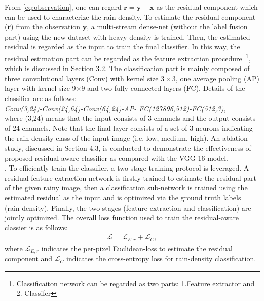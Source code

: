 \documentclass[10pt,twocolumn,letterpaper]{article}
\begin{document}
From \eqref{eq:observation}, one can regard $\mathbf{r}=\mathbf{y}-\mathbf{x}$ as the residual component which can be used to characterize the rain-density.   To estimate the residual component ($\mathbf{\hat{r}}$) from the observation $\mathbf{y}$,  a multi-stream dense-net (without the label fusion part) using the new dataset with heavy-density is trained.  Then, the estimated residual is regarded as the input to train the final classifier.  In this way, the residual estimation part can be regarded as the feature extraction procedure~\footnote{Classificaiton network can be regarded as two parts: 1.Feature extractor and 2. Classifer}, which is discussed in Section 3.2.  The classification part is mainly composed of three convolutional layers (Conv) with kernel size $3\times3$, one average pooling (AP) layer with kernel size 9$\times$9 and  two fully-connected layers (FC).  Details of the classifier are as follows:\\
\emph{Conv(3,24)-Conv(24,64)-Conv(64,24)-AP- FC(127896,512)-FC(512,3)},\\
where (3,24) means that the input consists of 3 channels and the output consists of 24 channels.  Note that the final layer  consists  of  a  set  of  3  neurons indicating  the  rain-density  class
of  the  input  image (i.e. low, medium, high). An ablation study, discussed in Section 4.3, is conducted to demonstrate the effectiveness of proposed residual-aware classifier as compared with the VGG-16 \cite{vgg} model.
\\





. To efficiently train the classifier, a two-stage training protocol is leveraged. A residual  feature extraction network is firstly trained to estimate the residual part of the given rainy image, then a classification sub-network is trained using the estimated residual as the input and is optimized via the ground truth labels (rain-density). Finally, the two stages (feature extraction and classification) are jointly optimized. The overall loss function used to train the residual-aware classier is as follows:  
 \begin{equation}
 \label{eq:loss_cla}
 \begin{split}
 \mathcal{L}= \mathcal{L}_{E,r}+  \mathcal{L}_C,
 \end{split}
  \end{equation}
where $\mathcal{L}_{E,r}$ indicates the per-pixel Euclidean-loss to estimate the residual component and $\mathcal{L}_C$ indicates the cross-entropy loss for rain-density classification.
 
\end{document}

